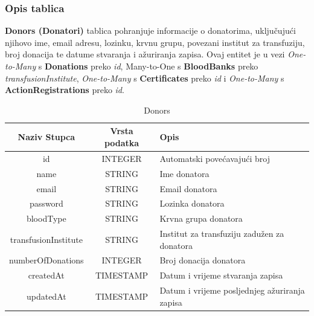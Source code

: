 \clearpage %
\subsubsection{Opis tablica}

\noindent
\textbf{Donors (Donatori)} tablica pohranjuje informacije o donatorima, uključujući
njihovo ime, email adresu, lozinku, krvnu grupu, povezani institut za transfuziju,
broj donacija te datume stvaranja i ažuriranja zapisa. Ovaj entitet je u vezi \textit{One-to-Many}
s \textbf{Donations} preko \textit{id}, {Many-to-One} s \textbf{BloodBanks}
preko \textit{transfusionInstitute}, \textit{One-to-Many} s \textbf{Certificates}
preko \textit{id} i \textit{One-to-Many} s \textbf{ActionRegistrations} preko \textit{id}.
\begin{table}[H]
	\renewcommand{\arraystretch}{2}
	\centering
	\begin{tabularx}
		{1\textwidth}{|c|c|X|} \hline \textbf{Naziv Stupca} & \textbf{Vrsta
		podatka} & \textbf{Opis}    \\ \hline \cellcolor{LightGreen} id & INTEGER &
		Automatski povećavajući broj \\ \hline name & STRING & Ime donatora \\
		\hline email & STRING & Email donatora \\ \hline password & STRING
		         & Lozinka donatora \\ \hline bloodType & STRING & Krvna grupa donatora \\
		\hline \cellcolor{LightBlue} transfusionInstitute & STRING & Institut za transfuziju
		zadužen za donatora \\ \hline numberOfDonations & INTEGER & Broj donacija donatora
		\\ \hline createdAt & TIMESTAMP & Datum i vrijeme stvaranja zapisa \\ \hline
		updatedAt & TIMESTAMP & Datum i vrijeme posljednjeg ažuriranja zapisa \\ \hline
	\end{tabularx}
	\caption{Donors}
	\label{tab:my_label}
\end{table}
\clearpage %

